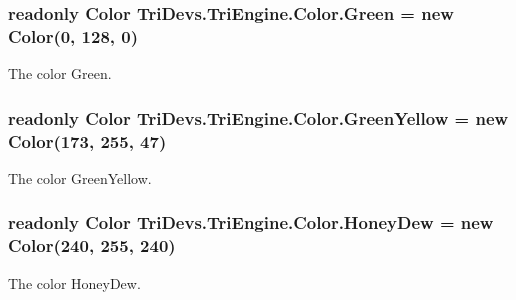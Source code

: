 \hypertarget{struct_tri_devs_1_1_tri_engine_1_1_color_a13d7c5260748494fa3d4137f26b2e8ae}{
\subsubsection[{Green}]{\setlength{\rightskip}{0pt plus 5cm}readonly {\bf Color} Tri\-Devs.\-Tri\-Engine.\-Color.\-Green = new {\bf Color}(0, 128, 0)\hspace{0.3cm}{\ttfamily [static]}}}\label{struct_tri_devs_1_1_tri_engine_1_1_color_a13d7c5260748494fa3d4137f26b2e8ae}


The color Green. 

\hypertarget{struct_tri_devs_1_1_tri_engine_1_1_color_af50c0617a04cb205d20b41beec343e2f}{
\subsubsection[{Green\-Yellow}]{\setlength{\rightskip}{0pt plus 5cm}readonly {\bf Color} Tri\-Devs.\-Tri\-Engine.\-Color.\-Green\-Yellow = new {\bf Color}(173, 255, 47)\hspace{0.3cm}{\ttfamily [static]}}}\label{struct_tri_devs_1_1_tri_engine_1_1_color_af50c0617a04cb205d20b41beec343e2f}


The color Green\-Yellow. 

\hypertarget{struct_tri_devs_1_1_tri_engine_1_1_color_a307fd0661fcfa7adfc2a988f0dbde7dc}{
\subsubsection[{Honey\-Dew}]{\setlength{\rightskip}{0pt plus 5cm}readonly {\bf Color} Tri\-Devs.\-Tri\-Engine.\-Color.\-Honey\-Dew = new {\bf Color}(240, 255, 240)\hspace{0.3cm}{\ttfamily [static]}}}\label{struct_tri_devs_1_1_tri_engine_1_1_color_a307fd0661fcfa7adfc2a988f0dbde7dc}


The color Honey\-Dew. 

